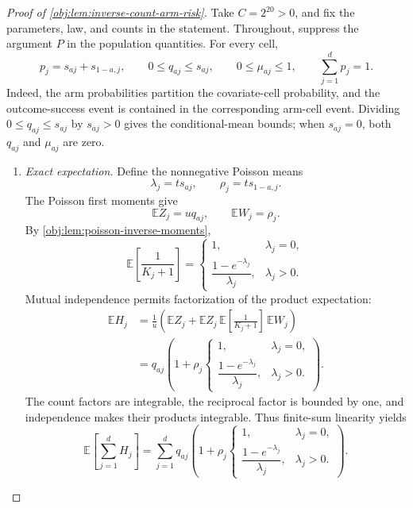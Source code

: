 \documentclass[11pt]{article}
\begin{document}
\begin{proof}[Proof of \cref{obj:lem:inverse-count-arm-risk}]
Take \(C=2^{20}>0\), and fix the parameters, law, and counts in the statement. Throughout, suppress the argument \(P\) in the population quantities. For every cell,
\[
p_j=s_{aj}+s_{1-a,j},\qquad
0\le q_{aj}\le s_{aj},\qquad
0\le\mu_{aj}\le1,\qquad
\sum_{j=1}^{d}p_j=1.
\]
Indeed, the arm probabilities partition the covariate-cell probability, and the outcome-success event is contained in the corresponding arm-cell event. Dividing \(0\le q_{aj}\le s_{aj}\) by \(s_{aj}>0\) gives the conditional-mean bounds; when \(s_{aj}=0\), both \(q_{aj}\) and \(\mu_{aj}\) are zero.

\begin{enumerate}
\item \emph{Exact expectation.}
Define the nonnegative Poisson means
\[
\lambda_j=t s_{aj},\qquad \rho_j=t s_{1-a,j}.
\]
The Poisson first moments give
\[
\mathbb E Z_j=u q_{aj},\qquad \mathbb E W_j=\rho_j.
\]
By \cref{obj:lem:poisson-inverse-moments},
\[
\mathbb E\!\left[\frac1{K_j+1}\right]
=
\begin{cases}
1,&\lambda_j=0,\\[2pt]
\dfrac{1-e^{-\lambda_j}}{\lambda_j},&\lambda_j>0.
\end{cases}
\]
Mutual independence permits factorization of the product expectation:
\[
\begin{aligned}
\mathbb E H_j
&=\frac1u\left(
\mathbb E Z_j+
\mathbb E Z_j\,
\mathbb E\!\left[\frac1{K_j+1}\right]\,
\mathbb E W_j\right)\\
&=q_{aj}\left(1+\rho_j
\begin{cases}
1,&\lambda_j=0,\\[2pt]
\dfrac{1-e^{-\lambda_j}}{\lambda_j},&\lambda_j>0.
\end{cases}\right).
\end{aligned}
\]
The count factors are integrable, the reciprocal factor is bounded by one, and independence makes their products integrable. Thus finite-sum linearity yields
\[
\mathbb E\!\left[\sum_{j=1}^{d}H_j\right]
=
\sum_{j=1}^{d}q_{aj}\left(1+\rho_j
\begin{cases}
1,&\lambda_j=0,\\[2pt]
\dfrac{1-e^{-\lambda_j}}{\lambda_j},&\lambda_j>0.
\end{cases}\right).
\]


\end{enumerate}
\end{proof}
\end{document}
